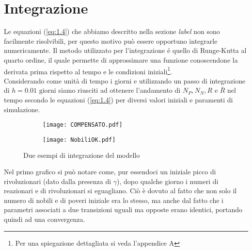 \section{Integrazione}
Le equazioni (\ref{eq:1.4}) che abbiamo descritto nella sezione \emph{label} non sono facilmente risolvibili, per questo motivo può essere opportuno integrarle numericamente. Il metodo utilizzato per l'integrazione é quello di Runge-Kutta al quarto ordine, il quale permette di approssimare una funzione conoscendone la derivata prima rispetto al tempo e le condizioni iniziali\footnote{Per una spiegazione dettagliata si veda l'appendice A}. \\
Considerando come unità di tempo i giorni e utilizzando un passo di integrazione di $ h=0.01 \text{ giorni}$ siamo riusciti ad ottenere l'andamento di $ N_{P}, N_{N}, R$ e $\bar{R} $ nel tempo secondo le equazioni (\ref{eq:1.4}) per diversi valori iniziali e paramenti di simulazione.
\begin{figure}[H]
	\centering
	\begin{subfigure}[H]{0.49\textwidth}
		\centering
		\texttt{[image: COMPENSATO.pdf]}
	\end{subfigure}
	\hfill
	\begin{subfigure}[H]{0.49\textwidth}
		\centering
		\texttt{[image: NobiliOK.pdf]}
	\end{subfigure}
\caption{Due esempi di integrazione del modello}
\end{figure}
Nel primo grafico si può notare come, pur essendoci un iniziale picco di rivoluzionari (dato dalla presenza di $ \gamma $), dopo qualche giorno i numeri di reazionari e di rivoluzionari si eguagliano. Ciò è dovuto al fatto che non solo il numero di nobili e di poveri iniziale era lo stesso, ma anche dal fatto che i parametri associati a due transizioni uguali ma opposte erano identici, portando quindi ad una convergenza.
